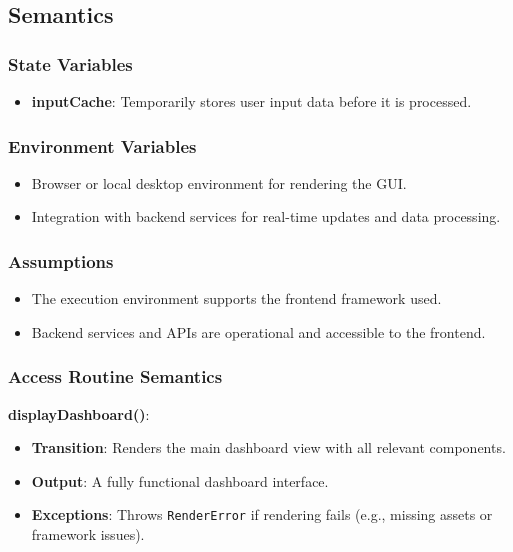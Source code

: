 \documentclass[12pt, titlepage]{article}
\begin{document}
\subsection{Semantics}

\subsubsection{State Variables}
\begin{itemize}
    \item \textbf{inputCache}: Temporarily stores user input data before it is processed.
\end{itemize}

\subsubsection{Environment Variables}
\begin{itemize}
    \item Browser or local desktop environment for rendering the GUI.
    \item Integration with backend services for real-time updates and data processing.
\end{itemize}

\subsubsection{Assumptions}
\begin{itemize}
    \item The execution environment supports the frontend framework used.
    \item Backend services and APIs are operational and accessible to the frontend.
\end{itemize}

\subsubsection{Access Routine Semantics}

\textbf{displayDashboard()}:
\begin{itemize}
    \item \textbf{Transition}: Renders the main dashboard view with all relevant components.
    \item \textbf{Output}: A fully functional dashboard interface.
    \item \textbf{Exceptions}: Throws \texttt{RenderError} if rendering fails (e.g., missing assets or framework issues).
\end{itemize}
\end{document}
